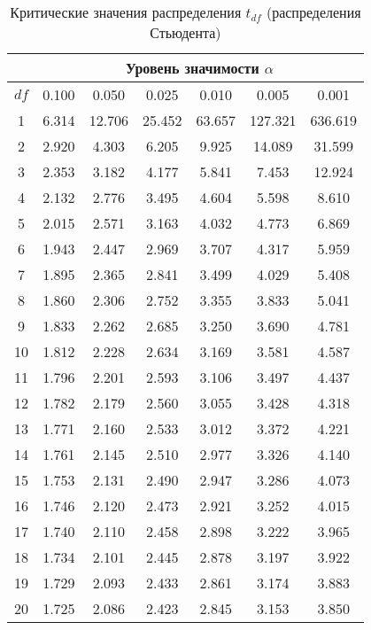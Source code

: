 \documentclass[12pt]{article}
\begin{document}
\begin{table}
\caption{Критические значения распределения $t_{df}$ (распределения
Стьюдента)}
\begin{center}
{\scriptsize
\begin{tabular}{|c|c|c|c|c|c|c|}
	\hline
	& \multicolumn{6}{c|}{Уровень значимости $\alpha$} \\ \hline
	$df$  & 0.100 &  0.050 &  0.025 &  0.010 &  0.005 &  0.001\\ \hline
	1 &  6.314 &  12.706 & 25.452 & 63.657 & 127.321& 636.619\\
	2 &  2.920 &  4.303 &  6.205 &  9.925 &  14.089 & 31.599\\
	3 &  2.353 &  3.182 &  4.177 &  5.841 &  7.453 &  12.924\\
	4 &  2.132 &  2.776 &  3.495 &  4.604 &  5.598 &  8.610\\
	5 &  2.015 &  2.571& 3.163 &  4.032 &  4.773 &  6.869\\
	6 &  1.943 &  2.447 &  2.969 &  3.707 &  4.317&   5.959\\
	7  & 1.895 &  2.365 &  2.841 &  3.499 &  4.029 &  5.408 \\
	8  & 1.860 &  2.306&2.752 &  3.355 &  3.833 &  5.041\\
	9 &  1.833 &  2.262 &  2.685 &  3.250 &  3.690 &  4.781\\
	10 & 1.812 &  2.228 &  2.634 &  3.169 &  3.581 &  4.587 \\
	11 & 1.796 &  2.201&2.593 &  3.106 &  3.497 &  4.437\\
	12 & 1.782 &  2.179 &  2.560 &  3.055 &  3.428 &  4.318\\
	13 & 1.771 &  2.160 &  2.533 &  3.012 &  3.372 &  4.221\\
	14 & 1.761&2.145 &2.510 &  2.977 &  3.326 &  4.140\\
	15 & 1.753 &  2.131 &  2.490& 2.947&3.286 &4.073 \\
	16 & 1.746 &  2.120 &  2.473 &  2.921 &  3.252& 4.015\\
	17 &1.740&2.110 &2.458 &  2.898 &  3.222 &  3.965 \\
	18  &1.734 &2.101 &2.445 &  2.878& 3.197& 3.922 \\
	19 & 1.729 &  2.093 &  2.433& 2.861& 3.174&   3.883 \\
	20 &1.725& 2.086 &2.423 &  2.845 &  3.153 &3.850 \\

\end{tabular}}
\end{center}
\end{table}
\end{document}
